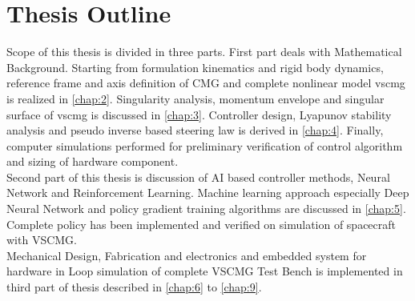 

\section{Thesis Outline}
Scope of this thesis is divided in three parts. First part deals with Mathematical Background. Starting from formulation kinematics and rigid body dynamics, reference frame and axis definition of CMG and complete nonlinear model \acrshort{vscmg} is realized in \autoref{chap:2}. Singularity analysis, momentum envelope and singular surface of \acrshort{vscmg} is discussed in \autoref{chap:3}. Controller design, Lyapunov stability analysis and pseudo inverse based steering law is derived in \autoref{chap:4}. Finally, computer simulations performed for preliminary verification of control algorithm and sizing of hardware component.\\


\noindent Second part of this thesis is discussion of AI based controller methods, Neural Network and Reinforcement Learning. Machine learning approach especially Deep Neural Network and policy gradient training algorithms are discussed in \autoref{chap:5}. Complete policy has been implemented and verified on simulation of spacecraft with VSCMG.\\

\noindent Mechanical Design, Fabrication and electronics and embedded system for hardware in Loop simulation of complete VSCMG Test Bench is implemented in third part of thesis described in \autoref{chap:6} to \autoref{chap:9}.

